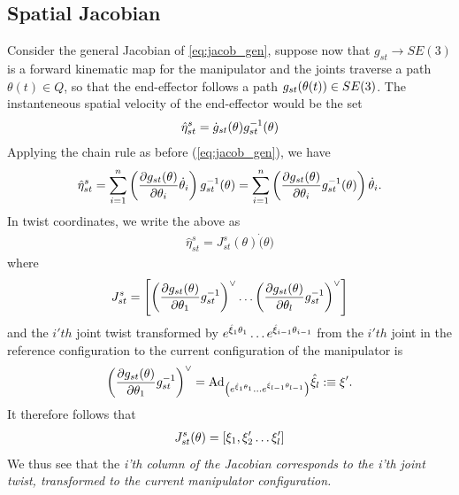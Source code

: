 \subsection{Spatial Jacobian}
%
Consider the general Jacobian of \eqref{eq:jacob_gen}, suppose now that $g_{st} \rightarrow SE(3)$ is a forward kinematic map for the manipulator and the joints traverse a path $\theta(t) \in Q$, so that the end-effector follows a path $g_{st}(\theta(t)) \in SE(3)$. The instanteneous spatial velocity of the end-effector would be the set 
%
\begin{align}
	\hat{\eta}^s_{st} = \dot{g}_{st}(\theta) g_{st}^{-1}(\theta)
	\label{eq:spatial_jacob}
\end{align}
%
Applying the chain rule as before (\cf \eqref{eq:jacob_gen}), we have 
%
\begin{align}
	\hat{\eta}^s_{st}  = \sum_{i=1}^{n} \left(\dfrac{\partial g_{st}({\theta})}{\partial \theta_i} \dot{\theta}_i \right) g_{st}^{-1}(\theta) =  \sum_{i=1}^{n} \left( \dfrac{\partial g_{st}({\theta})}{\partial \theta_i} g_{st}^{-1}(\theta) \right) \dot{\theta}_i.
\end{align}
%
In twist coordinates, we write the above as 
%
\begin{align}
		\hat{\eta}^s_{st}  = J_{st}^s(\theta) \dot(\theta)
\end{align}
%
where
%
\[
	J_{st}^s = \left[\left(\dfrac{\partial g_{st}({\theta})}{\partial \theta_1} g_{st}^{-1}\right)^\vee 
							\ldots
						    \left(\dfrac{\partial g_{st}({\theta})}{\partial \theta_l} g_{st}^{-1}\right)^\vee 
							\right]
\]
%
and the $i'th$ joint twist transformed by $e^{\hat{\xi}_1 \theta_1} \ldots e^{\hat{\xi}_{i-1}\theta_{i-1}}$ from the $i'th$ joint in the reference configuration to the current configuration of the manipulator is
%
\[
	\left(\dfrac{\partial g_{st}({\theta})}{\partial \theta_1} g_{st}^{-1}\right)^\vee = \text{Ad}_{\left(e^{\hat{\xi}_1 \theta_1}\ldots e^{\hat{\xi}_{l-1} \theta_{l-1}}\right)}\hat{\xi}_l :\equiv \xi^\prime.
\]
%
It therefore follows that 
%
\begin{align}
	J_{st}^s(\theta) = \left[\xi_1, \xi_2^\prime  \ldots \xi^\prime_l \right]
\end{align}
%
We thus see that the \textit{i'th column of the Jacobian corresponds to the i'th joint twist, transformed to the current manipulator configuration.}

